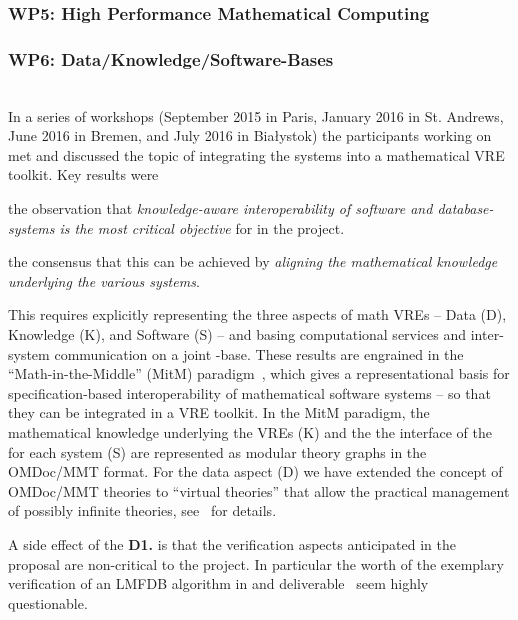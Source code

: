 \documentclass{deliverablereport}
\begin{document}
\subsubsection{WP5: High Performance Mathematical Computing}


\subsubsection{WP6: Data/Knowledge/Software-Bases }

~\\In a series of workshops (September 2015 in Paris, January 2016 in St. Andrews, June 2016
in Bremen, and July 2016 in Bia{\l}ystok) the participants working on  met
and discussed the topic of integrating the \pn systems into a mathematical VRE toolkit.
Key results were
\begin{compactitem}[\bf D1.]
\item the observation that \emph{knowledge-aware interoperability of software and
    database-systems is the most critical objective} for  in the \pn
  project.
\item the consensus that this can be achieved by \emph{aligning the mathematical knowledge
    underlying the various systems}.
\end{compactitem}
This requires explicitly representing the three aspects of math VREs -- Data (D),
Knowledge (K), and Software (S) -- and basing computational services and inter-system
communication on a joint \DKS-base. These results are engrained in the
``Math-in-the-Middle'' (MitM) paradigm~\cite{DehKohKon:iop16}, which gives a
representational basis for specification-based interoperability of mathematical software
systems -- so that they can be integrated in a VRE toolkit. In the MitM paradigm, the
mathematical knowledge underlying the VREs (K) and the the interface of the for each
system (S) are represented as modular theory graphs in the OMDoc/MMT format. For the data
aspect (D) we have extended the concept of OMDoc/MMT theories to ``virtual theories'' that
allow the practical management of possibly infinite theories, see~\cite{ODK-D6.2} for
details. 

A side effect of the \textbf{D1.} is that the verification aspects anticipated in the
proposal are non-critical to the \pn project. In particular the worth of the exemplary
verification of an LMFDB algorithm in  and
deliverable~ seem highly questionable.
\end{document}
